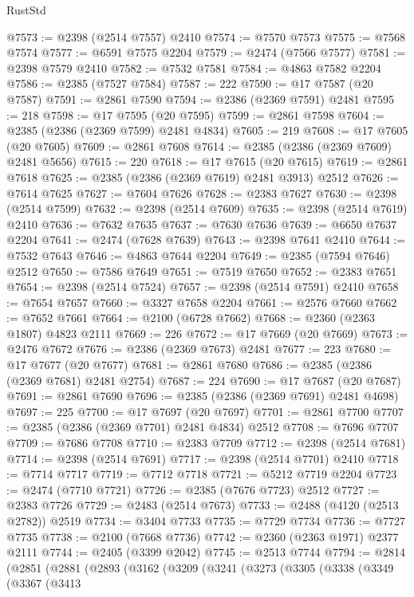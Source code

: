 \begin{lexlean}{RustStd}
\begin{coremodule}
@7573 := @2398 (@2514 @7557) @2410
@7574 := @7570 @7573
@7575 := @7568 @7574
@7577 := @6591 @7575 @2204
@7579 := @2474 (@7566 @7577)
@7581 := @2398 @7579 @2410
@7582 := @7532 @7581
@7584 := @4863 @7582 @2204
@7586 := @2385 (@7527 @7584)
@7587 := 222
@7590 := @17 @7587 (@20 @7587)
@7591 := @2861 @7590
@7594 := @2386 (@2369 @7591) @2481
@7595 := 218
@7598 := @17 @7595 (@20 @7595)
@7599 := @2861 @7598
@7604 := @2385 (@2386 (@2369 @7599) @2481 @4834)
@7605 := 219
@7608 := @17 @7605 (@20 @7605)
@7609 := @2861 @7608
@7614 := @2385 (@2386 (@2369 @7609) @2481 @5656)
@7615 := 220
@7618 := @17 @7615 (@20 @7615)
@7619 := @2861 @7618
@7625 := @2385 (@2386 (@2369 @7619) @2481 @3913) @2512
@7626 := @7614 @7625
@7627 := @7604 @7626
@7628 := @2383 @7627
@7630 := @2398 (@2514 @7599)
@7632 := @2398 (@2514 @7609)
@7635 := @2398 (@2514 @7619) @2410
@7636 := @7632 @7635
@7637 := @7630 @7636
@7639 := @6650 @7637 @2204
@7641 := @2474 (@7628 @7639)
@7643 := @2398 @7641 @2410
@7644 := @7532 @7643
@7646 := @4863 @7644 @2204
@7649 := @2385 (@7594 @7646) @2512
@7650 := @7586 @7649
@7651 := @7519 @7650
@7652 := @2383 @7651
@7654 := @2398 (@2514 @7524)
@7657 := @2398 (@2514 @7591) @2410
@7658 := @7654 @7657
@7660 := @3327 @7658 @2204
@7661 := @2576 @7660
@7662 := @7652 @7661
@7664 := @2100 (@6728 @7662)
@7668 := @2360 (@2363 @1807) @4823 @2111
@7669 := 226
@7672 := @17 @7669 (@20 @7669)
@7673 := @2476 @7672
@7676 := @2386 (@2369 @7673) @2481
@7677 := 223
@7680 := @17 @7677 (@20 @7677)
@7681 := @2861 @7680
@7686 := @2385 (@2386 (@2369 @7681) @2481 @2754)
@7687 := 224
@7690 := @17 @7687 (@20 @7687)
@7691 := @2861 @7690
@7696 := @2385 (@2386 (@2369 @7691) @2481 @4698)
@7697 := 225
@7700 := @17 @7697 (@20 @7697)
@7701 := @2861 @7700
@7707 := @2385 (@2386 (@2369 @7701) @2481 @4834) @2512
@7708 := @7696 @7707
@7709 := @7686 @7708
@7710 := @2383 @7709
@7712 := @2398 (@2514 @7681)
@7714 := @2398 (@2514 @7691)
@7717 := @2398 (@2514 @7701) @2410
@7718 := @7714 @7717
@7719 := @7712 @7718
@7721 := @5212 @7719 @2204
@7723 := @2474 (@7710 @7721)
@7726 := @2385 (@7676 @7723) @2512
@7727 := @2383 @7726
@7729 := @2483 (@2514 @7673)
@7733 := @2488 (@4120 (@2513 @2782)) @2519
@7734 := @3404 @7733
@7735 := @7729 @7734
@7736 := @7727 @7735
@7738 := @2100 (@7668 @7736)
@7742 := @2360 (@2363 @1971) @2377 @2111
@7744 := @2405 (@3399 @2042)
@7745 := @2513 @7744
@7794 := @2814
    (@2851
      (@2881
        (@2893
          (@3162
            (@3209
              (@3241
                (@3273
                  (@3305
                    (@3338
                      (@3349
                        (@3367
                          (@3413

\end{coremodule}
\end{lexlean}
